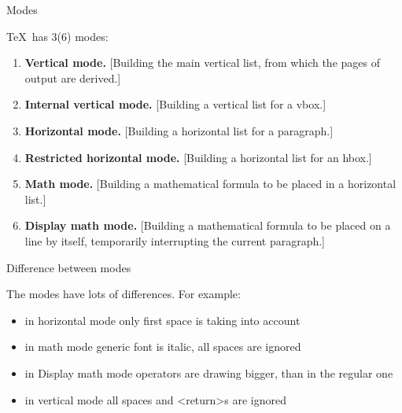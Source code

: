 \begin{frame}{Modes}\relax

    \TeX\ has 3(6) modes:
    \begin{enumerate}
        \item {\bfseries {\csk Vertical} mode.} [Building the main vertical list, from which the pages of
    output are derived.]
    \item {\bfseries Internal {\csk vertical} mode.} [Building a vertical list for a vbox.]
    \item {\bfseries {\csk Horizontal} mode.} [Building a horizontal list for a paragraph.]
    \item {\bfseries Restricted {\csk horizontal} mode.} [Building a horizontal list for an hbox.]
    \item {\bfseries {\csk Math} mode.} [Building a mathematical formula to be placed in a horizontal list.]
    \item {\bfseries Display {\csk math} mode.} [Building a mathematical formula to be placed on
    a line by itself, temporarily interrupting the current paragraph.]
         
    \end{enumerate}
     
\end{frame}

\begin{frame}{Difference between modes}

    The modes have lots of differences. For example:
    \begin{itemize}
        \item in horizontal mode only first space is taking into account
        \item in math mode generic font is italic, all spaces are ignored
        \item in Display math mode operators are drawing bigger, than in the regular one 
        \item in vertical mode all spaces and <return>s are ignored 
         
    \end{itemize}
\end{frame}

